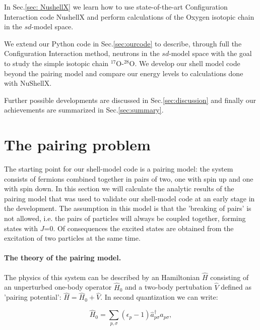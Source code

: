 \documentclass[twoside]{article}
\begin{document}
In Sec.\ref{sec: NushellX} we learn how to use state-of-the-art Configuration Interaction code NushellX and perform calculations of the Oxygen isotopic chain in the $sd$-model space.

We extend our Python code in Sec.\ref{sec:ourcode} to describe, through full the Configuration Interaction method, neutrons in the $sd$-model space with the goal to study the simple isotopic chain $^{17}$O-$^{28}$O. We develop our shell model code beyond the pairing model and compare our energy levels to calculations done with NuShellX.

Further possible developments are discussed in Sec.\ref{sec:discussion} and finally our achievements are summarized in Sec.\ref{sec:summary}.
 


\section{The pairing problem}
\label{sec:pair} 

The starting point for our shell-model code is a pairing model: the system consists of fermions combined together in pairs of two, one with spin up and one with spin down. In this section we will calculate the analytic results of the pairing model that was used to validate our shell-model code at an early stage in the development. The assumption in this model is that the 'breaking of pairs' is not allowed, i.e. the pairs of particles will always be coupled together, forming states with $J$=0. Of consequences the excited states are obtained from the excitation of two particles at the same time. 


\paragraph{The theory of the pairing model.} The physics of this system can be described by an Hamiltonian $\hat H$ consisting of an unperturbed one-body operator $\hat H_0$ and a two-body pertubation $\hat V $ defined as 'pairing potential': $\hat H = \hat H_0 + \hat V$. In second quantization we can write:

\begin{equation}
\hat H_0 =  \sum_{p,\sigma} (\epsilon_p-1) \hat a_{p\sigma}^\dagger \hat a_{p\sigma},
\label{eq:H_0}
\end{equation}
\end{document}
